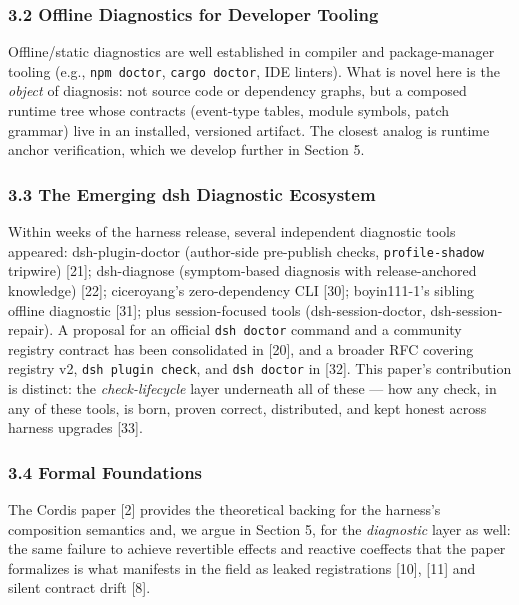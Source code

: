 \documentclass[
]{article}
\begin{document}
\subsubsection{3.2 Offline Diagnostics for Developer
Tooling}\label{offline-diagnostics-for-developer-tooling}

Offline/static diagnostics are well established in compiler and
package-manager tooling (e.g., \texttt{npm\ doctor},
\texttt{cargo\ doctor}, IDE linters). What is novel here is the
\emph{object} of diagnosis: not source code or dependency graphs, but a
composed runtime tree whose contracts (event-type tables, module
symbols, patch grammar) live in an installed, versioned artifact. The
closest analog is runtime anchor verification, which we develop further
in Section 5.

\subsubsection{3.3 The Emerging dsh Diagnostic
Ecosystem}\label{the-emerging-dsh-diagnostic-ecosystem}

Within weeks of the harness release, several independent diagnostic
tools appeared: dsh-plugin-doctor (author-side pre-publish checks,
\texttt{profile-shadow} tripwire) {[}21{]}; dsh-diagnose (symptom-based
diagnosis with release-anchored knowledge) {[}22{]}; ciceroyang's
zero-dependency CLI {[}30{]}; boyin111-1's sibling offline diagnostic
{[}31{]}; plus session-focused tools (dsh-session-doctor,
dsh-session-repair). A proposal for an official \texttt{dsh\ doctor}
command and a community registry contract has been consolidated in
{[}20{]}, and a broader RFC covering registry v2,
\texttt{dsh\ plugin\ check}, and \texttt{dsh\ doctor} in {[}32{]}. This
paper's contribution is distinct: the \emph{check-lifecycle} layer
underneath all of these --- how any check, in any of these tools, is
born, proven correct, distributed, and kept honest across harness
upgrades {[}33{]}.

\subsubsection{3.4 Formal Foundations}\label{formal-foundations}

The Cordis paper {[}2{]} provides the theoretical backing for the
harness's composition semantics and, we argue in Section 5, for the
\emph{diagnostic} layer as well: the same failure to achieve revertible
effects and reactive coeffects that the paper formalizes is what
manifests in the field as leaked registrations {[}10{]}, {[}11{]} and
silent contract drift {[}8{]}.
\end{document}
